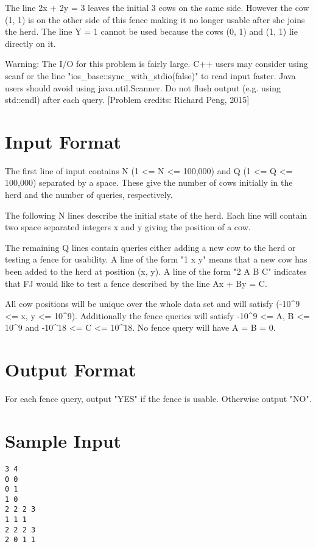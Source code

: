 \documentclass[12pt]{article}
\begin{document}
The line 2x + 2y = 3 leaves the initial 3 cows on the same side.  However the cow (1, 1) is on the other side of this fence making it no longer usable after she joins the herd.  The line Y = 1 cannot be used because the cows (0, 1) and (1, 1) lie directly on it.

Warning: The I/O for this problem is fairly large.  C++ users may consider using scanf or the line "ios_base::sync_with_stdio(false)" to read input faster.  Java users should avoid using java.util.Scanner.  Do not flush output (e.g. using std::endl) after each query.
[Problem credits: Richard Peng, 2015]



\section*{Input Format}
The first line of input contains N (1 <= N <= 100,000) and Q (1 <= Q <= 100,000) separated by a space.  These give the number of cows initially in the herd and the number of queries, respectively.

The following N lines describe the initial state of the herd. Each line will contain two space separated integers x and y giving the position of a cow.

The remaining Q lines contain queries either adding a new cow to the herd or testing a fence for usability.  A line of the form "1 x y" means that a new cow has been added to the herd at position (x, y).  A line of the form "2 A B C" indicates that FJ would like to test a fence described by the line Ax + By = C.

All cow positions will be unique over the whole data set and will satisfy (-10^9 <= x, y <= 10^9).  Additionally the fence queries will satisfy -10^9 <= A, B <= 10^9 and -10^18 <= C <= 10^18.  No fence query will have A = B = 0.

\section*{Output Format}
For each fence query, output "YES" if the fence is usable.  Otherwise output "NO".

\section*{Sample Input}
\begin{verbatim}
3 4
0 0
0 1
1 0
2 2 2 3
1 1 1
2 2 2 3
2 0 1 1
\end{verbatim}
\end{document}
